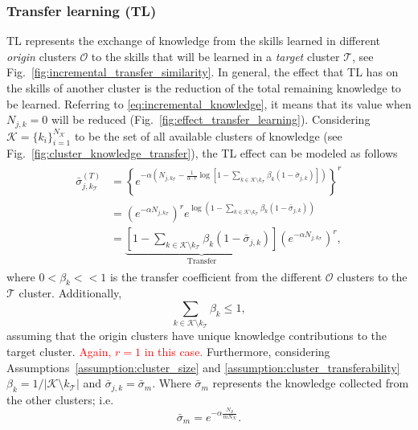 \subsubsection{\textbf{Transfer learning (TL)}}

TL represents the exchange of knowledge from the skills learned in different \emph{origin} clusters $\mathcal{O}$ to the skills that will be learned in a \emph{target} cluster $\mathcal{T}$, see Fig.~\ref{fig:incremental_transfer_similarity}. In general, the effect that TL has on the skills of another cluster is the reduction of the total remaining knowledge to be learned. Referring to \eqref{eq:incremental_knowledge}, it means that its value when $N_{j,k} = 0$ will be reduced (Fig.~\ref{fig:effect_transfer_learning}). Considering $\mathcal{K} = \{ k_i \}^{N_\mathcal{K}}_{i=1}$ to be the set of all available clusters of knowledge (see Fig.~\ref{fig:cluster_knowledge_transfer}), the TL effect can be modeled as follows
\begin{align}
	\begin{split}
		\bar{\sigma}^{(T)}_{j,k_\mathcal{T}} &= \left\{ e^{-\alpha \left(N_{j,k_\mathcal{T}} - \frac{1}{\alpha \cdot r}  \log\left[ 1- \sum\limits_{k\in \mathcal{K} \setminus k_\mathcal{T}}\beta_k(1 - \bar{\sigma}_{j,k}) \right] \right)}\right\}^r\\
		&= \left(e^{-\alpha {N_{j,k_\mathcal{T}}}} \right)^r e^{  \log\left( 1-\sum\limits_{k \in \mathcal{K} \setminus k_\mathcal{T}}\beta_k(1 - \bar{\sigma}_{j,k}) \right) }\\
		&= \underbrace{\left[1- \sum\limits_{k \in \mathcal{K} \setminus k_\mathcal{T}}\beta_k \left( 1 - \bar{\sigma}_{j,k} \right)\right]}_{\text{Transfer}} \left(e^{-\alpha N_{j,k_\mathcal{T}}} \right)^r ,
	\end{split}
\end{align}
where $0<\beta_k << 1$ is the transfer coefficient from the different $\mathcal{O}$ clusters to the $\mathcal{T}$ cluster. Additionally,
\begin{equation}
    \sum\limits_{k \in \mathcal{K} \setminus k_\mathcal{T}}\beta_k \leq 1,
\end{equation}
assuming that the origin clusters have unique knowledge contributions to the target cluster. \textcolor{red}{Again, $ r = 1 $ in this case.} Furthermore, considering Assumptions~\ref{assumption:cluster_size} and \ref{assumption:cluster_transferability} $ \beta_k = 1/\rvert \mathcal{K} \setminus k_\mathcal{T} \lvert$ and $ \bar{\sigma}_{j,k} = \bar{\sigma}_m $. Where $ \bar{\sigma}_m $ represents the knowledge collected from the other clusters; i.e.
\begin{equation}
	\bar{\sigma}_m = e^{-\alpha \frac{N_\mathcal{S}}{m N_\mathcal{K}}}.
\end{equation}

